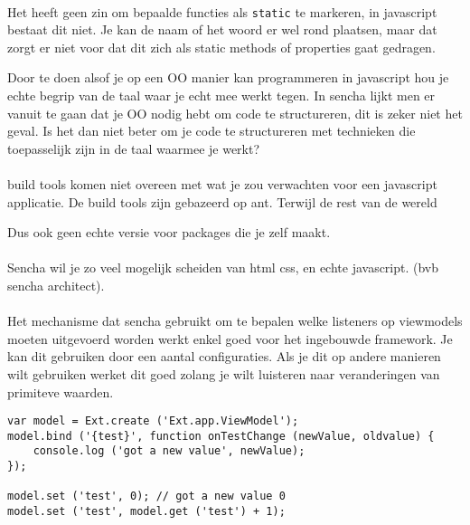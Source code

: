 \paragraph {} Het heeft geen zin om bepaalde functies als \lstinline{static} te markeren,
in javascript bestaat dit niet. Je kan de naam of het woord er wel rond plaatsen, maar dat
zorgt er niet voor dat dit zich als static methods of properties gaat gedragen.

Door te doen alsof je op een OO manier kan programmeren in javascript
hou je echte begrip van de taal waar je echt mee werkt tegen. In sencha lijkt men er
vanuit te gaan dat je OO nodig hebt om code te structureren, dit is zeker niet het geval.
Is het dan niet beter om je code te structureren met technieken die toepasselijk zijn in
de taal waarmee je werkt?


\paragraph {} build tools komen niet overeen met wat je zou verwachten voor een javascript
applicatie. De build tools zijn gebazeerd op ant. Terwijl de rest van de wereld

Dus ook geen echte versie voor packages die je zelf maakt.


\paragraph {} Sencha wil je zo veel mogelijk scheiden van html css, en echte javascript.
(bvb sencha architect).

\paragraph {} Het mechanisme dat sencha gebruikt om te bepalen welke listeners op
viewmodels moeten uitgevoerd worden werkt enkel goed voor het ingebouwde framework. Je kan
dit gebruiken door een aantal configuraties. Als je dit op andere manieren wilt gebruiken
werket dit goed zolang je wilt luisteren naar veranderingen van primiteve waarden.

\begin{lstlisting}[language=ownjavascript]
var model = Ext.create ('Ext.app.ViewModel');
model.bind ('{test}', function onTestChange (newValue, oldvalue) {
	console.log ('got a new value', newValue);
});

model.set ('test', 0); // got a new value 0
model.set ('test', model.get ('test') + 1);
\end{lstlisting}

